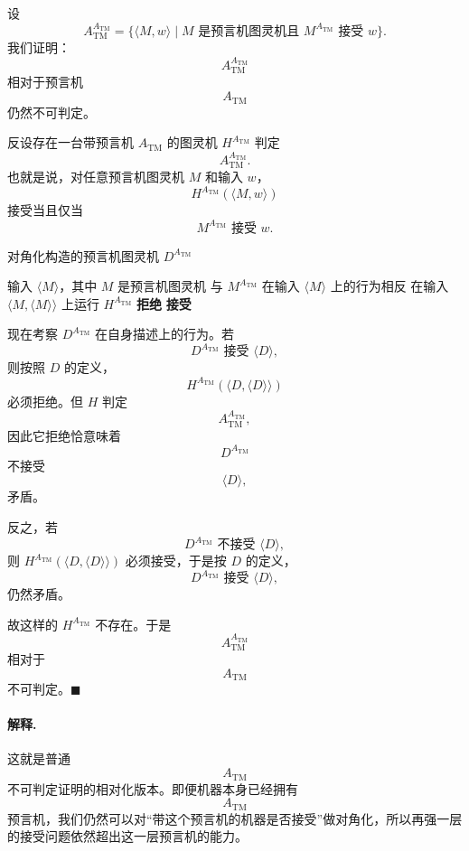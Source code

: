 \begin{answerred}
设
\[
    A_{\mathrm{TM}}^{A_{\mathrm{TM}}}
    =
    \{\langle M,w\rangle \mid M \text{ 是预言机图灵机且 } M^{A_{\mathrm{TM}}} \text{ 接受 } w\}.
\]
我们证明：
\[
    A_{\mathrm{TM}}^{A_{\mathrm{TM}}}
\]
相对于预言机
\[
    A_{\mathrm{TM}}
\]
仍然不可判定。

\medskip
反设存在一台带预言机 $A_{\mathrm{TM}}$ 的图灵机 $H^{A_{\mathrm{TM}}}$ 判定
\[
    A_{\mathrm{TM}}^{A_{\mathrm{TM}}}.
\]
也就是说，对任意预言机图灵机 $M$ 和输入 $w$，
\[
    H^{A_{\mathrm{TM}}}(\langle M,w\rangle)
\]
接受当且仅当
\[
    M^{A_{\mathrm{TM}}} \text{ 接受 } w.
\]

\begin{myalgo}{对角化构造的预言机图灵机 $D^{A_{\mathrm{TM}}}$}
\begin{algorithmic}[1]
  \Require 输入 $\langle M\rangle$，其中 $M$ 是预言机图灵机
  \Ensure 与 $M^{A_{\mathrm{TM}}}$ 在输入 $\langle M\rangle$ 上的行为相反
  \State 在输入 $\langle M,\langle M\rangle\rangle$ 上运行 $H^{A_{\mathrm{TM}}}$
    \State \textbf{拒绝}
  \Else
    \State \textbf{接受}
  \EndIf
\end{algorithmic}
\end{myalgo}

现在考察 $D^{A_{\mathrm{TM}}}$ 在自身描述上的行为。若
\[
    D^{A_{\mathrm{TM}}} \text{ 接受 } \langle D\rangle,
\]
则按照 $D$ 的定义，
\[
    H^{A_{\mathrm{TM}}}(\langle D,\langle D\rangle\rangle)
\]
必须拒绝。但 $H$ 判定
\[
    A_{\mathrm{TM}}^{A_{\mathrm{TM}}},
\]
因此它拒绝恰意味着
\[
    D^{A_{\mathrm{TM}}}
\]
不接受
\[
    \langle D\rangle,
\]
矛盾。

\medskip
反之，若
\[
    D^{A_{\mathrm{TM}}} \text{ 不接受 } \langle D\rangle,
\]
则 $H^{A_{\mathrm{TM}}}(\langle D,\langle D\rangle\rangle)$ 必须接受，于是按 $D$ 的定义，
\[
    D^{A_{\mathrm{TM}}} \text{ 接受 } \langle D\rangle,
\]
仍然矛盾。

\medskip
故这样的 $H^{A_{\mathrm{TM}}}$ 不存在。于是
\[
    A_{\mathrm{TM}}^{A_{\mathrm{TM}}}
\]
相对于
\[
    A_{\mathrm{TM}}
\]
不可判定。$\blacksquare$

\begin{answernote}
\paragraph{解释.}
这就是普通
\[
    A_{\mathrm{TM}}
\]
不可判定证明的相对化版本。即便机器本身已经拥有
\[
    A_{\mathrm{TM}}
\]
预言机，我们仍然可以对“带这个预言机的机器是否接受”做对角化，所以再强一层的接受问题依然超出这一层预言机的能力。

\end{answernote}
\end{answerred}
